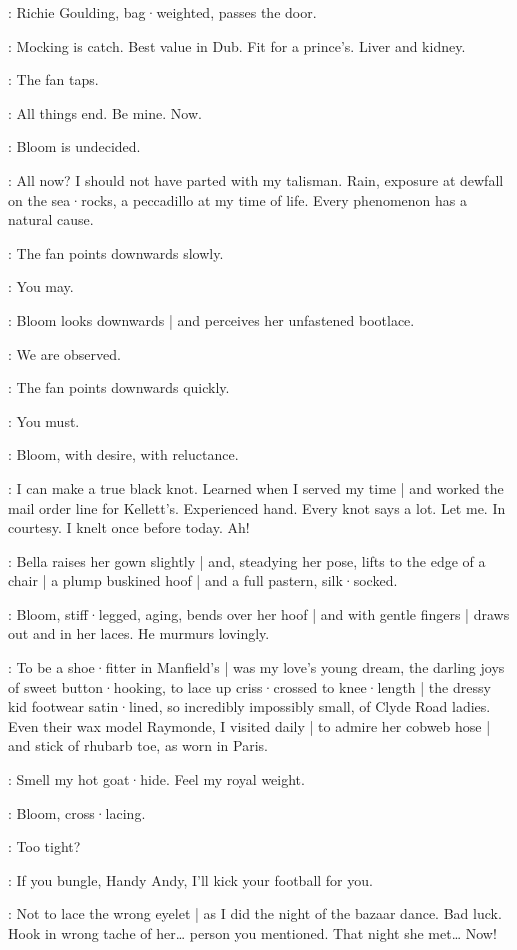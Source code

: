 :
Richie Goulding,
bag·weighted,
passes the door.

\Richie:
Mocking is catch.
Best value in Dub.
Fit for a prince's.
%
Liver and kidney.

:
The fan taps.

\Fan:
All things end.
Be mine.
Now.

:
Bloom is undecided.

\Bloom:
All now?
I should not have parted with my talisman.
Rain,
exposure at dewfall on the sea·rocks,
a peccadillo at my time of life.
Every phenomenon has a natural cause.

:
The fan points downwards slowly.

\Fan:
You may.

:
Bloom looks downwards |
and perceives her unfastened bootlace.

\Bloom:
We are observed.

:
The fan points downwards quickly.

\Fan:
You must.

:
Bloom,
with desire,
with reluctance.

\Bloom:
I can make a true black knot.
Learned when I served my time |
and worked the mail order line for Kellett's.
Experienced hand.
Every knot says a lot.
Let me.
In courtesy.
I knelt once before today.
Ah!

:
Bella raises her gown slightly |
and,
steadying her pose,
lifts to the edge of a chair |
a plump buskined hoof |
%
and a full pastern,
silk·socked.

:
Bloom,
stiff·legged,
aging,
bends over her hoof |
and with gentle fingers |
draws out and in her laces.
He murmurs lovingly.

\Bloom:
To be a shoe·fitter in Manfield's |
was my love's young dream,
the darling joys of sweet button·hooking,
to lace up criss·crossed to knee·length |
the dressy kid footwear satin·lined,
so incredibly impossibly small,
of Clyde Road ladies.
Even their wax model Raymonde,
I visited daily |
to admire her cobweb hose |
and stick of rhubarb toe,
as worn in Paris.

\Hoof[2]:
Smell my hot goat·hide.
%
Feel my royal weight.

:
Bloom,
cross·lacing.

\Bloom:
Too tight?

\Hoof:
If you bungle,
Handy Andy,
I'll kick your football for you.

\Bloom:
Not to lace the wrong eyelet |
as I did the night of the bazaar dance.
Bad luck.
Hook in wrong tache of her…
person you mentioned.
That night she met…
Now!

